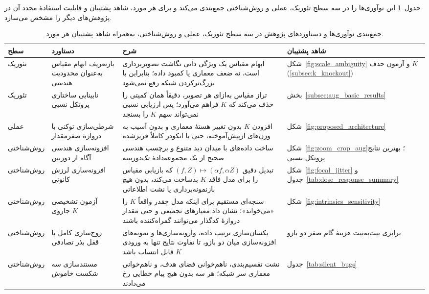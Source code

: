 جدول~\ref{tab:contributions_summary} این نوآوری‌ها را در سه سطح تئوریک،
عملی و روش‌شناختی جمع‌بندی می‌کند و برای هر مورد، شاهد پشتیبان و
قابلیت استفادهٔ مجدد آن در پژوهش‌های دیگر را مشخص می‌سازد.

\begin{table}[htbp]
\centering
\caption[جمع‌بندی نوآوری‌ها و دستاوردهای پژوهش]{جمع‌بندی نوآوری‌ها و
دستاوردهای پژوهش در سه سطح تئوریک، عملی و روش‌شناختی، به‌همراه شاهد پشتیبان
هر مورد.}
\label{tab:contributions_summary}
\footnotesize
\renewcommand{\arraystretch}{1.3}
\begin{tabularx}{\textwidth}{@{}
  >{\raggedleft\arraybackslash}p{}
  >{\raggedleft\arraybackslash}p{}
  >{\raggedleft\arraybackslash}X
  >{\raggedleft\arraybackslash}p{}@{}}
\toprule
سطح & دستاورد & شرح & شاهد پشتیبان \\ \midrule
تئوریک & بازتعریف ابهام مقیاس به‌عنوان محدودیت هندسی &
ابهام مقیاس یک ویژگی ذاتی نگاشت تصویربرداری است، نه ضعف معماری یا کمبود داده؛ بنابراین با بزرگ‌ترکردن شبکه رفع نمی‌شود &
شکل~\ref{fig:scale_ambiguity} و آزمون حذف $K$ (\ref{subsec:k_knockout}) \\
تئوریک & نابینایی ساختاری پروتکل نسبی &
تراز مقیاس به‌ازای هر تصویر، دقیقاً همان کمیتی را حذف می‌کند که $K$ فراهم می‌آورد؛ پس ارزیابی نسبی نمی‌تواند سهم $K$ را بسنجد &
بخش~\ref{subsec:aug_basic_results} \\
عملی & شرطی‌سازی توکنی با دروازهٔ صفرمقدار &
افزودن $K$ بدون تغییر هستهٔ معماری و بدون آسیب به وزن‌های ازپیش‌آموخته، حتی با انکودر کاملاً فریزشده &
شکل~\ref{fig:proposed_architecture} \\
روش‌شناختی & افزونه‌سازی هندسی آگاه از دوربین &
ساخت داده‌های با میدان دید متنوع و برچسب هندسی صحیح از یک مجموعه‌دادهٔ تک‌دوربینه &
شکل~\ref{fig:zoom_crop_aug}؛ بهترین نتایج پروتکل نسبی \\
روش‌شناختی & افزونه‌سازی لرزش کانونی &
تبدیل دقیق $(f,Z)\mapsto(\alpha f,\alpha Z)$ که بازیابی مقیاس را برای مدل فاقد $K$ بدساخت می‌کند، بدون هیچ بازنمونه‌برداری یا نشت اطلاعاتی &
شکل~\ref{fig:focal_jitter} و جدول~\ref{tab:dose_response_summary} \\
روش‌شناختی & آزمون تشخیصی جاروی $K$ &
سنجه‌ای مستقیم برای اینکه مدل چقدر واقعاً $K$ را «می‌خواند»؛ نشان داد معیارهای تجمیعی و حتی مقدار دروازهٔ کدگذار می‌توانند گمراه‌کننده باشند &
شکل~\ref{fig:intrinsics_sensitivity} \\
روش‌شناختی & زوج‌سازی کامل با قفل بذر تصادفی &
یکسان‌سازی ترتیب داده، وارونه‌سازی‌ها و نمونه‌های افزونه‌سازی میان دو بازو، تا تفاوت نتایج تنها به ورودی $K$ قابل انتساب باشد &
برابری بیت‌به‌بیت هزینهٔ گام صفر دو بازو \\
روش‌شناختی & مستندسازی سه شکست خاموش &
نشت تقسیم‌بندی، ناهم‌خوانی فضای هدف، و ناهم‌خوانی معماری سر شبکه؛ هر سه بدون هیچ پیام خطایی رخ می‌دادند &
جدول~\ref{tab:silent_bugs} \\
\bottomrule
\end{tabularx}
\end{table}

